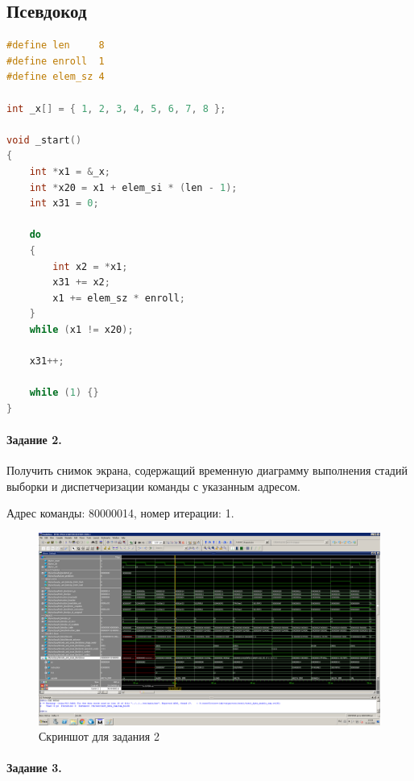 \pagebreak

\subsection{Псевдокод}

\begin{lstlisting}[language=C,caption=Эквивалентный код на С.]
#define len 	8
#define enroll 	1
#define elem_sz 4

int _x[] = { 1, 2, 3, 4, 5, 6, 7, 8 };

void _start()
{
	int *x1 = &_x;
	int *x20 = x1 + elem_si * (len - 1);
	int x31 = 0;
	
	do
	{
		int x2 = *x1;
		x31 += x2;
		x1 += elem_sz * enroll;
	}
	while (x1 != x20);
	
	x31++;
	
	while (1) {}
}
\end{lstlisting}

\pagebreak

\paragraph{Задание 2.}

Получить снимок экрана, содержащий временную диаграмму выполнения стадий выборки и диспетчеризации команды с указанным адресом.

Адрес команды: 80000014, номер итерации: 1.

\begin{figure}
	\includegraphics[width=\textwidth,height=\textheight,keepaspectratio]{img/img1.png}
	\caption{Скриншот для задания 2}
\end{figure}

\clearpage

\paragraph{Задание 3.}

